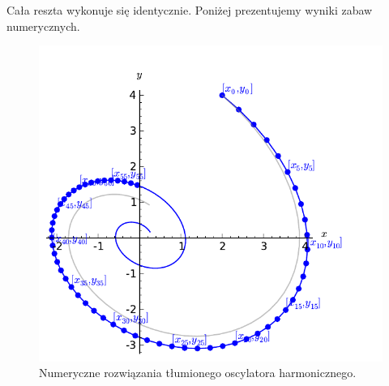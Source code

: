 \documentclass[a4paper,12pt,polish]{sphinxmanual}
\begin{document}
Cała reszta wykonuje się identycznie. Poniżej prezentujemy wyniki zabaw numerycznych.
\begin{figure}[htbp]
\centering
\capstart

\includegraphics{sage_chI021_02.pdf}
\caption{Numeryczne rozwiązania tłumionego oscylatora harmonicznego.}\end{figure}
\end{document}
